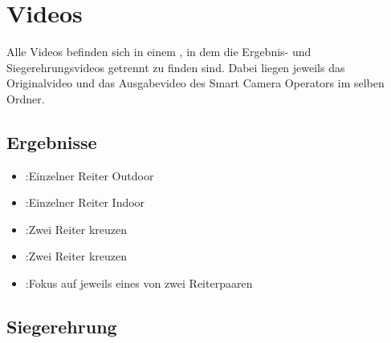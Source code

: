 \chapter{Videos}

Alle Videos befinden sich in einem
\href{https://uni-muenster.sciebo.de/s/FCpRRcPnGg2HgHa}{\color{blue}{Sciebo-Ordner}}
, in dem die Ergebnis- und Siegerehrungsvideos getrennt zu finden sind.
Dabei liegen jeweils das Originalvideo und das Ausgabevideo des Smart Camera Operators im selben Ordner.
\section{Ergebnisse}
\begin{itemize}
\item \label{vid1} \href{https://uni-muenster.sciebo.de/s/5kyXkH1xph6GRwV}{\color{blue}{Video1}}:Einzelner Reiter Outdoor
\item \label{vid2} \href{}{\color{blue}{Video2}}:Einzelner Reiter Indoor
\item \label{vid3} \href{}{\color{blue}{Video3}}:Zwei Reiter kreuzen
\item \label{vid4} \href{}{\color{blue}{Video4}}:Zwei Reiter kreuzen
\item \label{vid5} \href{https://uni-muenster.sciebo.de/s/1PTl9dlBgHArqcX}{\color{blue}{Video5}}:Fokus auf jeweils eines von zwei Reiterpaaren
\end{itemize}
\section{Siegerehrung}